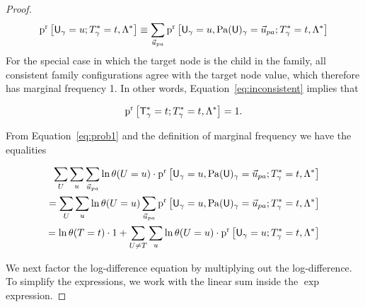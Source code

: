 \documentclass[twoside,11pt]{article}
\begin{document}
\begin{proof}
\begin{equation*} 
 \Relfreq{\Ground{\UI}  = \UV} {\Qconj} \equiv \sum_{\Prange{\UT}}\Relfreq{\Appendterm{\Ground{\UI}  = \UV} {\Ground{\Pa{\UI}} =\Prange{\UT}}} {\Qconj}
\end{equation*}
%
For the special case in which the target node is the child in the family, all consistent family configurations agree with the target node value, which therefore has marginal frequency 1. In other words, Equation~\eqref{eq:inconsistent} implies that 

\begin{equation} \label{eq:prob1}
\mathrm{p}^{\mathrm{r}}\left[\mathsf{T}_\gamma^{*}\hspace{0.0ex} = t;T_{\gamma}^{*}\hspace{0.0ex} = t, \Lambda^{*}\hspace{0.0ex}\right] = 1.
\end{equation}

From Equation~\eqref{eq:prob1} and the definition of marginal frequency we have the equalities

\begin{eqnarray}
\sum_{\UT} \sum_{\UV} \sum_{\Prange{\UT}} \ln \jprob{\UT = \UV} \cdot \Relfreq{\Appendterm{\Ground{\UI}  = \UV} {\Ground{\Pa{\UI}} = \Prange{\UT}}} {\Qconj} \nonumber\\
=\sum_{\UT} \sum_{\UV} \ln \jprob{\UT = \UV} \sum_{\Prange{\UT}} \nonumber\Relfreq{\Appendterm{\Ground{\UI}  = \UV} {\Ground{\Pa{\UI}} = \Prange{\UT}}} {\Qconj}
\\ = \ln \jprob{\TT = \TV} \cdot 1 + \sum_{\UT \neq \TT} \sum_{\UV} \ln \jprob{\UT = \UV} \cdot \Relfreq{\Ground{\UI}  = \UV} {\Qconj} \label{eq:factorout}
\end{eqnarray}


We next factor the log-difference equation by multiplying out the log-difference. To simplify the expressions, we work with the linear sum inside the $\exp$ expression.




\end{proof}
\end{document}
